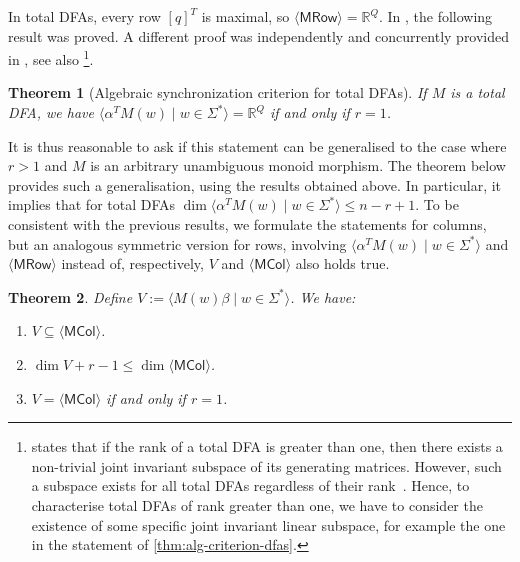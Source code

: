 \documentclass[11pt,a4paper]{amsart}
\newcommand{\spn}[1]{\mathord{\langle #1 \rangle}}
\newcommand{\MCol}{\mathsf{MCol}}
\newcommand{\MRow}{\mathsf{MRow}}
\theoremstyle{plain}
\newtheorem{thm}{Theorem}[section]
\theoremstyle{definition}
\theoremstyle{defC}
\theoremstyle{thmC}
\theoremstyle{plain}
\numberwithin{equation}{section}
\begin{document}
In total DFAs, every row $[q]^T$ is maximal, so $\spn{\MRow} = \mathbb{R}^Q$. In \cite[Criterion~1]{DBLP:journals/isci/BerlinkovS16}, the following result was proved. A different proof was independently and concurrently provided in \cite[\S8]{Voynov2015Compact}, see also \cite{Protasov2021}\footnote{ \cite[Theorem 2]{Protasov2021} states that if the rank of a total DFA is greater than one, then there exists a non-trivial joint invariant subspace of its generating matrices. However, such a subspace exists for all total DFAs regardless of their rank~\cite[Corollary 4]{Protasov2017}. 
Hence, to characterise total DFAs of rank greater than one, we have to consider the existence of some specific joint invariant linear subspace, for example the one in the statement of \autoref{thm:alg-criterion-dfas}.}.

\begin{thm}[Algebraic synchronization criterion for total DFAs]\label{thm:alg-criterion-dfas}
    If $M$ is a total DFA, we have 
    $\spn{\alpha^T M(w) \mid w \in \Sigma^*} = \mathbb{R}^Q$
    if and only if $r=1$.
\end{thm}

\noindent
It is thus reasonable to ask if this statement can be generalised to the case where $r > 1$ and $M$ is an arbitrary unambiguous monoid morphism. The theorem below provides such a generalisation, using the results obtained above. In particular, it implies that for total DFAs $\dim \spn{\alpha^T M(w) \mid w \in \Sigma^*} \le n - r + 1$. To be consistent with the previous results, we formulate the statements for columns, but an analogous symmetric version for rows, involving $\spn{\alpha^T M(w) \mid w \in \Sigma^*}$ and $\spn{\MRow}$ instead of, respectively, $V$ and $\spn{\MCol}$ also holds true. 

\begin{thm}\label{thm:algebraic}
Define $V := \spn{M(w) \beta \mid w \in \Sigma^*}$.
We have:
\begin{enumerate}
\item[(a)] $V \subseteq \spn{\MCol}$.
\item[(b)] $\dim V + r-1 \le \dim \spn{\MCol}$.
\item[(c)] $V = \spn{\MCol}$ if and only if $r=1$.
\end{enumerate}
\end{thm}
\end{document}
